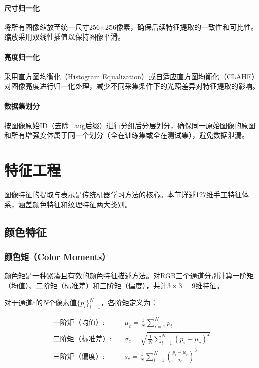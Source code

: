 \documentclass[UTF8,a4paper,12pt]{ctexart}
\numberwithin{figure}{section}
\numberwithin{table}{section}
\begin{document}
\paragraph{尺寸归一化} 将所有图像缩放至统一尺寸256×256像素，确保后续特征提取的一致性和可比性。缩放采用双线性插值以保持图像平滑。

\paragraph{亮度归一化} 采用直方图均衡化（Histogram Equalization）或自适应直方图均衡化（CLAHE）对图像亮度进行归一化处理，减少不同采集条件下的光照差异对特征提取的影响。

\paragraph{数据集划分} 按图像原始ID（去除\_aug后缀）进行分组后分层划分，确保同一原始图像的原图和所有增强变体属于同一个划分（全在训练集或全在测试集），避免数据泄漏。

\section{特征工程}\label{sec:feature}

图像特征的提取与表示是传统机器学习方法的核心。本节详述127维手工特征体系，涵盖颜色特征和纹理特征两大类别。

\subsection{颜色特征}

\subsubsection{颜色矩（Color Moments）}

颜色矩是一种紧凑且有效的颜色特征描述方法。对RGB三个通道分别计算一阶矩（均值）、二阶矩（标准差）和三阶矩（偏度），共计$3 \times 3 = 9$维特征。

对于通道$c$的$N$个像素值$\{p_i\}_{i=1}^{N}$，各阶矩定义为：

\begin{align}
\text{一阶矩（均值）:}\quad & \mu_c = \frac{1}{N}\sum_{i=1}^{N} p_i \\
\text{二阶矩（标准差）:}\quad & \sigma_c = \sqrt{\frac{1}{N}\sum_{i=1}^{N} (p_i - \mu_c)^2} \\
\text{三阶矩（偏度）:}\quad & s_c = \frac{1}{N}\sum_{i=1}^{N} \left(\frac{p_i - \mu_c}{\sigma_c}\right)^3
\end{align}
\end{document}
